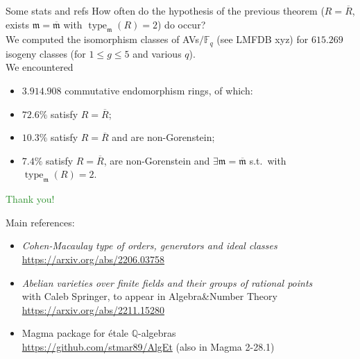 \documentclass[usenames,dvipsnames,handout]{beamer}
\def\Q{\mathbb{Q}}
\def\F{\mathbb{F}}
\DeclareMathOperator{\type}{type}
\renewcommand{\frm}{{\mathfrak m}}
\newcommand{\green}[1]{\textcolor{ForestGreen}{#1}}
\begin{document}
\begin{frame}{ Some stats and refs }
    How often do the hypothesis of the previous theorem ($R=\overline R$, exists $\frm =\overline \frm$ with $\type_\frm(R)=2$) do occur?\\

    We computed the isomorphism classes of AVs$/\F_q$ (see LMFDB xyz) for $615.269$ isogeny classes (for $1\leq g \leq 5$ and various $q$).\\
    We encountered
    \begin{itemize}
        \item $3.914.908$ commutative endomorphism rings, of which:
        \item \pause $72.6 \%$ satisfy $R=\overline{R}$;
        \item \pause $10.3 \%$ satisfy $R=\overline{R}$ and are non-Gorenstein;
        \item \pause $7.4 \%$ satisfy $R=\overline{R}$, are non-Gorenstein and $\exists \frm=\overline \frm$ s.t.~with $\type_\frm(R)=2$.
	\end{itemize}
\end{frame}

\begin{frame}{  }
    \begin{center}
    \green{\huge Thank you!}
    \end{center}
    \pause 
    {\footnotesize Main references:
    \begin{itemize}
        \item \emph{Cohen-Macaulay type of orders, generators and ideal classes}\\
            \url{https://arxiv.org/abs/2206.03758}
        \item \emph{Abelian varieties over finite fields and their groups of rational points}\\
            with Caleb Springer, to appear in Algebra\&Number Theory\\
            \url{https://arxiv.org/abs/2211.15280}
        \item Magma package for \'etale $\Q$-algebras\\
            \url{https://github.com/stmar89/AlgEt} 
            (also in Magma 2-28.1)
    \end{itemize}
    }
\end{frame}

	
\end{document}

